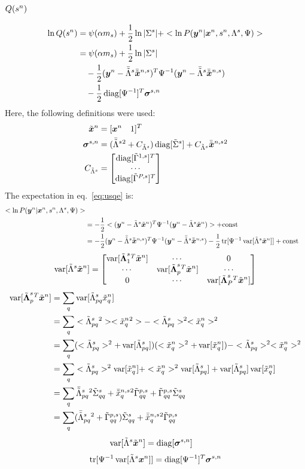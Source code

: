 \documentclass[a4paper]{article}
\begin{document}
\subsection{$Q(\Xs)$}
\newcommand{\Xsvv}{\bs{\sigma}^{s,n}}
\newcommand{\Xsvm}{C_{\Xlt}}
\begin{align}
  \ln Q(\Xs)
  &=\psi(\alpha m_s)+\frac{1}{2}\ln |\Xxv|+<\ln P(\Xy|\Xx,\Xs,\Xl,\Psi)> \label{eq:usqe} \\
  &=\psi(\alpha m_s)+\frac{1}{2}\ln |\Xxv| \nonumber \\
  &\quad-\frac{1}{2}(\Xy-\Xltm\Xxtm)^T\Xpsii(\Xy-\Xltm\Xxtm) \nonumber \\
  &\quad-\frac{1}{2}\Xdiag[\Xpsii]^T \Xsvv
\end{align}
Here, the following definitions were used:
\begin{align}
  \Xxt &= [\Xx \quad 1]^T \\
  \Xsvv &= (\Xltm{}^2+\Xsvm)\Xdiag[\Xxtv]+ \Xsvm \Xxtm{}^2 \\
  \Xsvm &= \begin{bmatrix}
    \Xdiag[\tilde{\Gamma}^{1,s}]^T \\
    \cdots \\
    \Xdiag[\tilde{\Gamma}^{P,s}]^T \\
  \end{bmatrix}
\end{align}
The expectation in eq.~\ref{eq:usqe} is:
\begin{align}
  <\ln P(\Xy|\Xx,\Xs,\Xl,\Psi)> \\
  &=-\frac{1}{2}<(\Xy-\Xlt\Xxt)^T\Xpsii(\Xy-\Xlt\Xxt)> + \text{const} \\
  &=-\frac{1}{2}(\Xy-\Xltm\Xxtm)^T\Xpsii(\Xy-\Xltm\Xxtm)
  -\frac{1}{2}\Xtr[\Xpsii \Xvar[\Xlt\Xxt]] + \text{const}
\end{align}
\begin{align}
  \Xvar[\Xlt\Xxt]=
  \begin{bmatrix}
    \Xvar[\Xltb_1{}^T\Xxt] & \cdots & 0 \\
    \cdots & \Xvar[\Xltb_p{}^T\Xxt] & \cdots \\
    0   & \cdots & \Xvar[\Xltb_P{}^T\Xxt]
  \end{bmatrix}
\end{align}
\begin{align}
  \Xvar[\Xltp{}^T\Xxt]
  &=\sum_q\Xvar[\Xltpq\Xxtq] \\
  &=\sum_q<\Xltpq{}^2><\Xxtq{}^2>-<\Xltpq>^2<\Xxtq>^2 \label{eq:usv1} \\
  &=\sum_q(<\Xltpq>^2+\Xvar[\Xltpq])(<\Xxtq>^2+\Xvar[\Xxtq])-<\Xltpq>^2<\Xxtq>^2 \label{eq:usv2} \\
  &=\sum_q<\Xltpq>^2\Xvar[\Xxtq]+<\Xxtq>^2\Xvar[\Xltpq]+\Xvar[\Xltpq]\Xvar[\Xxtq] \\
  &=\sum_q\Xltmpq{}^2\Xxtv_{qq}+\Xxtmq{}^2\Xltvp_{qq}+\Xltvp_{qq}\Xxtv_{qq} \\
  &=\sum_q(\Xltmpq{}^2+\Xltvp_{qq})\Xxtv_{qq}+\Xxtmq{}^2\Xltvp_{qq}
\end{align}
\begin{align}
  \Xvar[\Xlt\Xxt] &= \Xdiag[\Xsvv]
\end{align}
\begin{align}
  \Xtr[\Xpsii \Xvar[\Xlt \Xx]] = \Xdiag[\Xpsii]^T \Xsvv \label{eq:usv3}
\end{align}



\end{document}
